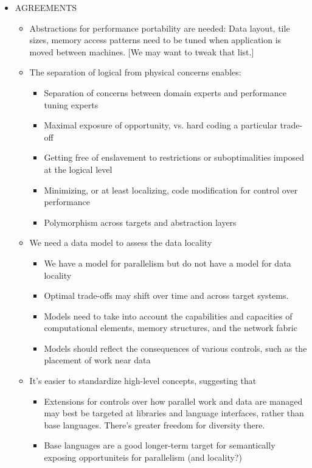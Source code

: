 \begin{itemize}
\begin{itemize}
\item AGREEMENTS
  \begin{itemize}
  \item Abstractions for performance portability are needed: Data layout, tile sizes, memory access patterns need to be tuned when application is moved between machines. [We may want to tweak that list.]
  \item The separation of logical from physical concerns enables:
    \begin{itemize}
    \item Separation of concerns between domain experts and performance tuning experts
    \item Maximal exposure of opportunity, vs. hard coding a particular trade-off
    \item Getting free of enslavement to restrictions or suboptimalities imposed at the logical level
    \item Minimizing, or at least localizing, code modification for control over performance
    \item Polymorphism across targets and abstraction layers
    \end{itemize}
  \item We need a data model to assess the data locality
    \begin{itemize}
    \item We have a model for parallelism but do not have a model for data locality
    \item Optimal trade-offs may shift over time and across target systems.  
    \item Models need to take into account the capabilities and capacities of computational elements, memory structures, and the network fabric 
    \item Models should reflect the consequences of various controls, such as the placement of work near data
    \end{itemize}
  \item It's easier to standardize high-level concepts, suggesting that
    \begin{itemize}
    \item Extensions for controls over how parallel work and data are managed may best be targeted at libraries and language interfaces, rather than base languages.  There's greater freedom for diversity there.
    \item Base languages are a good longer-term target for semantically exposing opportuniteis for parallelism (and locality?)
    \end{itemize}

\end{itemize}
\end{itemize}
\end{itemize}
